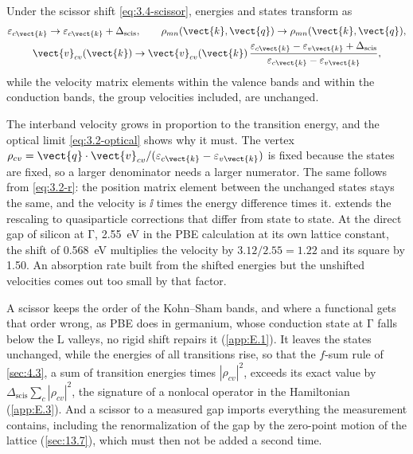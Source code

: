 \begin{keyresult}
Under the scissor shift \cref{eq:3.4-scissor}, energies and states transform as
\begin{equation}
  \begin{gathered}
  \varepsilon_{c\vect{k}} \to \varepsilon_{c\vect{k}} + \Delta_{\mathrm{scis}}, \qquad \rho_{mn}(\vect{k}, \vect{q}) \to \rho_{mn}(\vect{k}, \vect{q}), \\
  \vect{v}_{cv}(\vect{k}) \to \vect{v}_{cv}(\vect{k})\,\frac{\varepsilon_{c\vect{k}} - \varepsilon_{v\vect{k}} + \Delta_{\mathrm{scis}}}{\varepsilon_{c\vect{k}} - \varepsilon_{v\vect{k}}} ,
  \end{gathered}
  \label{eq:3.4-vscis}
\end{equation}
while the velocity matrix elements within the valence bands and within the conduction bands, the group velocities included, are unchanged.
\end{keyresult}
The interband velocity grows in proportion to the transition energy, and the optical limit \cref{eq:3.2-optical} shows why it must. The vertex $\rho_{cv} = \vect{q}\cdot\vect{v}_{cv}/(\varepsilon_{c\vect{k}} - \varepsilon_{v\vect{k}})$ is fixed because the states are fixed, so a larger denominator needs a larger numerator. The same follows from \cref{eq:3.2-r}: the position matrix element between the unchanged states stays the same, and the velocity is $\ii$ times the energy difference times it.  extends the rescaling to quasiparticle corrections that differ from state to state. At the direct gap of silicon at $\mathrm{\Gamma}$, \SI{2.55}{eV} in the PBE calculation at its own lattice constant, the shift of \SI{0.568}{eV} multiplies the velocity by $3.12/2.55 = 1.22$ and its square by 1.50. An absorption rate built from the shifted energies but the unshifted velocities comes out too small by that factor.

A scissor keeps the order of the Kohn--Sham bands, and where a functional gets that order wrong, as PBE does in germanium, whose conduction state at $\mathrm{\Gamma}$ falls below the $\mathrm{L}$ valleys, no rigid shift repairs it (\cref{app:E.1}). It leaves the states unchanged, while the energies of all transitions rise, so that the $f$-sum rule of \cref{sec:4.3}, a sum of transition energies times $|\rho_{cv}|^2$, exceeds its exact value by $\Delta_{\mathrm{scis}}\sum_c|\rho_{cv}|^2$, the signature of a nonlocal operator in the Hamiltonian (\cref{app:E.3}). And a scissor to a measured gap imports everything the measurement contains, including the renormalization of the gap by the zero-point motion of the lattice (\cref{sec:13.7}), which must then not be added a second time.

